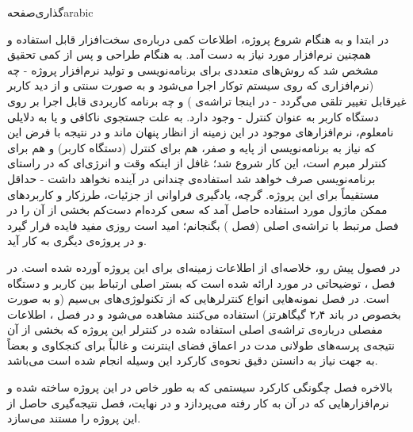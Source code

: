 ‌گذاری‌صفحه{arabic}‬


در ابتدا و به هنگام شروع پروژه، اطلاعات کمی درباره‌ی سخت‌افزار قابل استفاده و همچنین نرم‌افزار مورد نیاز به دست آمد. به هنگام طراحی و پس از کمی تحقیق مشخص شد که روش‌های متعددی برای برنامه‌نویسی و تولید نرم‌افزار پروژه - چه  (نرم‌افزاری که روی سیستم توکار اجرا می‌شود و به صورت سنتی و از دید کاربر غیرقابل تغییر تلقی می‌گردد - در اینجا تراشه‌ی ) و چه برنامه کاربردی قابل اجرا بر روی دستگاه کاربر به عنوان کنترل - وجود دارد. به علت جستجوی ناکافی و یا به دلایلی نامعلوم، نرم‌افزارهای موجود در این زمینه از انظار پنهان ماند و در نتیجه با فرض این که نیاز به برنامه‌نویسی از پایه و صفر، هم برای کنترل (دستگاه کاربر) و هم برای کنترلر مبرم است، این کار شروع شد؛ غافل از اینکه وقت و انرژی‌ای که در راستای برنامه‌نویسی صرف خواهد شد استفاده‌ی چندانی در آینده نخواهد داشت - حداقل مستقیماً برای این پروژه. گرچه، یادگیری فراوانی از جزئیات، طرزکار و کاربردهای ممکن ماژول مورد استفاده حاصل آمد که سعی کرده‌ام دست‌کم بخشی از آن را در فصل مرتبط با تراشه‌ی اصلی (فصل ) بگنجانم؛ امید است روزی مفید فایده قرار گیرد و در پروژه‌ی دیگری به کار آید.

در فصول پیش رو، خلاصه‌ای از اطلاعات زمینه‌ای برای این پروژه آورده شده است. در فصل ، توضیحاتی در مورد  ارائه شده است که بستر اصلی ارتباط بین کاربر و دستگاه است. در فصل  نمونه‌هایی انواع کنترلرهایی که از تکنولوژی‌های بی‌سیم (و به صورت بخصوص در باند ۲٫۴ گیگاهرتز) استفاده می‌کنند مشاهده می‌شود و در فصل ، اطلاعات مفصلی درباره‌ی تراشه‌ی اصلی استفاده شده در کنترلر این پروژه که بخشی از آن نتیجه‌ی پرسه‌های طولانی مدت در اعماق فضای اینترنت و غالباً برای کنجکاوی و بعضاً به جهت نیاز به دانستن دقیق نحوه‌ی کارکرد این وسیله انجام شده است می‌باشد.

بالاخره فصل  چگونگی کارکرد سیستمی که به طور خاص در این پروژه ساخته شده و نرم‌افزارهایی که در آن به کار رفته می‌پردازد و در نهایت، فصل  نتیجه‌گیری حاصل از این پروژه را مستند می‌سازد.

